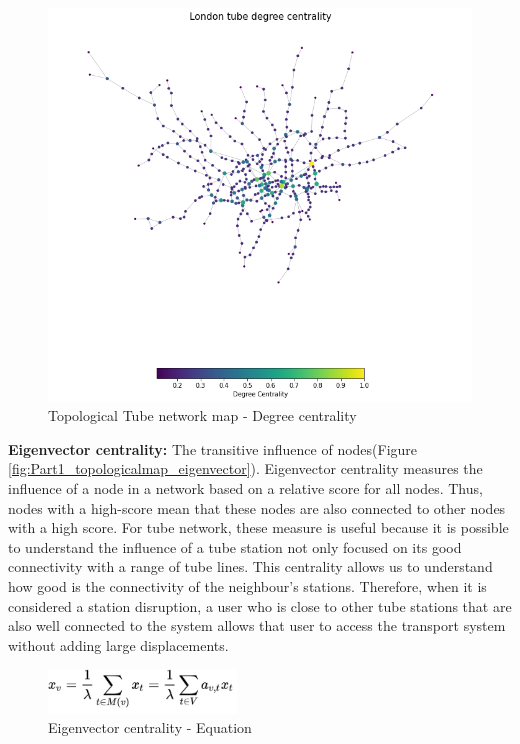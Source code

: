 \documentclass[10pt]{report}
\numberwithin{figure}{section}
\numberwithin{table}{section}
\begin{document}
    \begin{figure}[htp]
        \centering
        \includegraphics[width=12cm]{Image/Part1_topologicalmap_degree.png}
        \caption{Topological Tube network map - Degree centrality}
        \label{fig:Part1_topologicalmap_degree}
    \end{figure}   


        
\newpage  
        
        \textbf{Eigenvector centrality:}  The transitive influence of nodes(Figure \ref{fig:Part1_topologicalmap_eigenvector}). Eigenvector centrality measures the influence of a node in a network based on a relative score for all nodes. Thus, nodes with a high-score mean that these nodes are also connected to other nodes with a high score\cite{networkx_centrality_2023}. For tube network, these measure is useful because it is possible to understand the influence of a tube station not only focused on its good connectivity with a  range of tube lines. This centrality allows us to understand how good is the connectivity of the neighbour's stations. Therefore, when it is considered a station disruption, a user who is close to other tube stations that are also well connected to the system allows that user to access the transport system without adding large displacements.

    \vspace{5mm} %
        
    \begin{figure}[htp]
        \centering
        \includegraphics[width=5cm]{Image/eigenvector equation.jpeg}
        \caption{Eigenvector centrality - Equation}
        \label{fig:eigenvector equation}
    \end{figure} 
\end{document}
